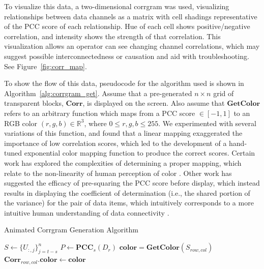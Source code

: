 To visualize this data, a two-dimensional corrgram was used, visualizing relationships between data channels as a matrix with cell shadings representative of the PCC score of each relationship. Hue of each cell shows positive/negative correlation, and intensity shows the strength of that correlation. This visualization allows an operator can see changing channel correlations, which may suggest possible interconnectedness or causation and aid with troubleshooting. See Figure~\ref{fig:corr_map}.

To show the flow of this data, pseudocode for the algorithm used is shown in Algorithm~\ref{alg:corrgram_get}. Assume that a pre-generated $n \times n$ grid of transparent blocks, $\textbf{Corr}$, is displayed on the screen. Also assume that $\textbf{GetColor}$ refers to an arbitrary function which maps from a PCC score $\in [-1,1]$ to an RGB color $(r, g, b) \in \mathbb{R}^{3}$, where $0 \leq r, g, b \leq 255$. We experimented with several variations of this function, and found that a linear mapping exaggerated the importance of low correlation scores, which led to the development of a hand-tuned exponential color mapping function to produce the correct scores. Certain work has explored the complexities of determining a proper mapping, which relate to the non-linearity of human perception of color \cite{friendly2002corrgrams}. Other work has suggested the efficacy of pre-squaring the PCC score before display, which instead results in displaying the coefficient of determination (i.e., the shared portion of the variance) for the pair of data items, which intuitively corresponds to a more intuitive human understanding of data connectivity \cite{rummelcorrelation}.

\begin{algorithm}
    \caption{Animated Corrgram Generation Algorithm}\label{alg:corrgram_get}
    \begin{algorithmic}[1]
        \State $S \gets \{U_{:,j}\}_{j=t-s}^{n}$ 
        \State $P\gets \textbf{PCC}_{s}(D_{r})$ 
                \State $\textbf{color} = \textbf{GetColor}(S_{row, col})$ 
                \State $\textbf{Corr}_{row, col}\textbf{.color} \gets \textbf{color}$ 
            \EndFor
        \EndFor
        \EndProcedure {}
    \end{algorithmic}
\end{algorithm}

